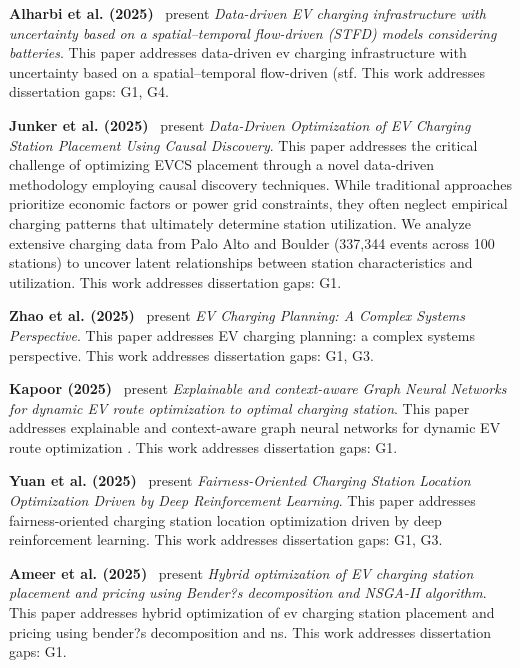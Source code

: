 \documentclass[letterpaper, 12pt, oneside, doublespacing]{Thesis}
\begin{document}
\noindent \textbf{Alharbi et al. (2025)}~\cite{data-driven_ev_2025} present \textit{Data-driven EV charging infrastructure with uncertainty based on a spatial--temporal flow-driven (STFD) models considering batteries}. This paper addresses data-driven ev charging infrastructure with uncertainty based on a spatial--temporal flow-driven (stf. This work addresses dissertation gaps: G1, G4.



\noindent \textbf{Junker et al. (2025)}~\cite{data-driven_optimization_2025} present \textit{Data-Driven Optimization of EV Charging Station Placement Using Causal Discovery}. This paper addresses the critical challenge of optimizing EVCS placement through a novel data-driven methodology employing causal discovery techniques. While traditional approaches prioritize economic factors or power grid constraints, they often neglect empirical charging patterns that ultimately determine station utilization. We analyze extensive charging data from Palo Alto and Boulder (337,344 events across 100 stations) to uncover latent relationships between station characteristics and utilization. This work addresses dissertation gaps: G1.



\noindent \textbf{Zhao et al. (2025)}~\cite{electric_vehicle_2025} present \textit{EV Charging Planning: A Complex Systems Perspective}. This paper addresses EV charging planning: a complex systems perspective. This work addresses dissertation gaps: G1, G3.



\noindent \textbf{Kapoor (2025)}~\cite{explainable_and_2025} present \textit{Explainable and context-aware Graph Neural Networks for dynamic EV route optimization to optimal charging station}. This paper addresses explainable and context-aware graph neural networks for dynamic EV route optimization . This work addresses dissertation gaps: G1.



\noindent \textbf{Yuan et al. (2025)}~\cite{planning_future_2025} present \textit{Fairness-Oriented Charging Station Location Optimization Driven by Deep Reinforcement Learning}. This paper addresses fairness-oriented charging station location optimization driven by deep reinforcement learning. This work addresses dissertation gaps: G1, G3.



\noindent \textbf{Ameer et al. (2025)}~\cite{hybrid_optimization_2025} present \textit{Hybrid optimization of EV charging station placement and pricing using Bender?s decomposition and NSGA-II algorithm}. This paper addresses hybrid optimization of ev charging station placement and pricing using bender?s decomposition and ns. This work addresses dissertation gaps: G1.
\end{document}
